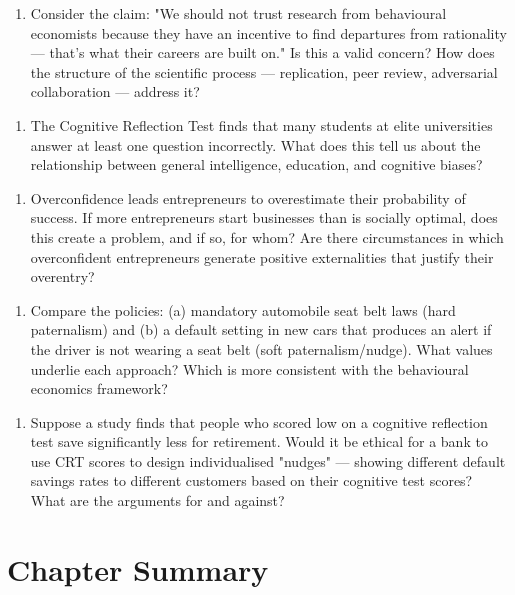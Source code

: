 \documentclass[12pt, letterpaper]{article}
\begin{document}
\begin{enumerate}
\item Consider the claim: "We should not trust research from behavioural economists because they have an incentive to find departures from rationality --- that's what their careers are built on." Is this a valid concern? How does the structure of the scientific process --- replication, peer review, adversarial collaboration --- address it?
\end{enumerate}

\begin{enumerate}
\item The Cognitive Reflection Test finds that many students at elite universities answer at least one question incorrectly. What does this tell us about the relationship between general intelligence, education, and cognitive biases?
\end{enumerate}

\begin{enumerate}
\item Overconfidence leads entrepreneurs to overestimate their probability of success. If more entrepreneurs start businesses than is socially optimal, does this create a problem, and if so, for whom? Are there circumstances in which overconfident entrepreneurs generate positive externalities that justify their overentry?
\end{enumerate}

\begin{enumerate}
\item Compare the policies: (a) mandatory automobile seat belt laws (hard paternalism) and (b) a default setting in new cars that produces an alert if the driver is not wearing a seat belt (soft paternalism/nudge). What values underlie each approach? Which is more consistent with the behavioural economics framework?
\end{enumerate}

\begin{enumerate}
\item Suppose a study finds that people who scored low on a cognitive reflection test save significantly less for retirement. Would it be ethical for a bank to use CRT scores to design individualised "nudges" --- showing different default savings rates to different customers based on their cognitive test scores? What are the arguments for and against?
\end{enumerate}

\medskip


\section*{Chapter Summary}
\end{document}
